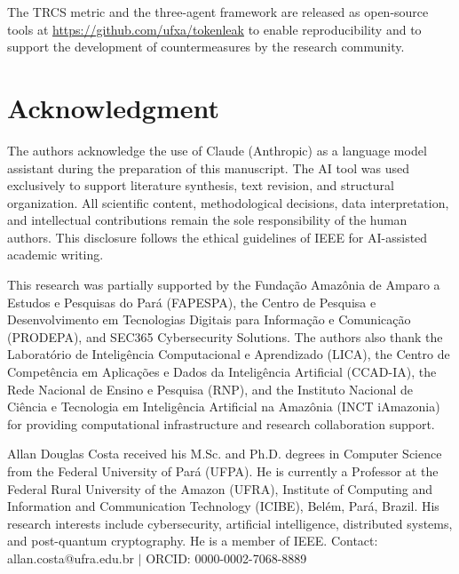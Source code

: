 \documentclass[journal,10pt,twocolumn]{IEEEtran}
\begin{document}
The TRCS metric and the three-agent framework are released
as open-source tools at \url{https://github.com/ufxa/tokenleak}
to enable reproducibility and to support the development of
countermeasures by the research community.

\section*{Acknowledgment}

The authors acknowledge the use of Claude (Anthropic) as a
language model assistant during the preparation of this
manuscript. The AI tool was used exclusively to support
literature synthesis, text revision, and structural organization.
All scientific content, methodological decisions, data
interpretation, and intellectual contributions remain the sole
responsibility of the human authors. This disclosure follows the
ethical guidelines of IEEE for AI-assisted academic writing.

This research was partially supported by the Funda\c{c}\~{a}o
Amaz\^{o}nia de Amparo a Estudos e Pesquisas do Par\'{a}
(FAPESPA), the Centro de Pesquisa e Desenvolvimento em
Tecnologias Digitais para Informa\c{c}\~{a}o e Comunica\c{c}\~{a}o
(PRODEPA), and SEC365 Cybersecurity Solutions. The authors also
thank the Laborat\'{o}rio de Intelig\^{e}ncia Computacional e
Aprendizado (LICA), the Centro de Compet\^{e}ncia em
Aplica\c{c}\~{o}es e Dados da Intelig\^{e}ncia Artificial
(CCAD-IA), the Rede Nacional de Ensino e Pesquisa (RNP), and
the Instituto Nacional de Ci\^{e}ncia e Tecnologia em
Intelig\^{e}ncia Artificial na Amaz\^{o}nia (INCT iAmazonia)
for providing computational infrastructure and research
collaboration support.

\begin{IEEEbiographynophoto}{Allan Douglas Costa}
received his M.Sc. and Ph.D. degrees in Computer Science from the
Federal University of Par\'{a} (UFPA). He is currently a Professor
at the Federal Rural University of the Amazon (UFRA), Institute of
Computing and Information and Communication Technology (ICIBE),
Bel\'{e}m, Par\'{a}, Brazil. His research interests include
cybersecurity, artificial intelligence, distributed systems, and
post-quantum cryptography. He is a member of IEEE.
Contact: allan.costa@ufra.edu.br $|$ ORCID: 0000-0002-7068-8889
\end{IEEEbiographynophoto}



\end{document}
